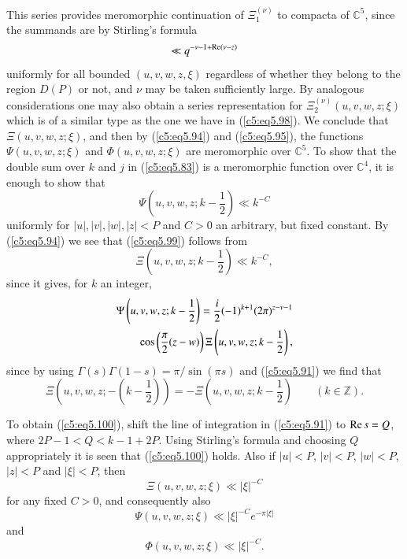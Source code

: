 This series provides meromorphic continuation of $\Xi^{(\nu)}_1$ to
compacta of $\mathbb{C}^5$, since the summands are by Stirling's
formula 
$$
\ll q^{-\nu - 1+ \operatorname{Re} (\nu-z)}
$$
uniformly for all bounded $(u,v,w,z,\xi)$ regardless of whether they
belong to the region $D(P)$ or not, and $\nu$ may be taken
sufficiently large. By analogous considerations one may also obtain a
series representation for $\Xi^{(\nu)}_2(u,v,w,z;\xi)$ which is of a
similar type as the one we have in (\ref{c5:eq5.98}). We conclude that
$\Xi (u,v,w,z;\xi)$, and then by (\ref{c5:eq5.94}) and
(\ref{c5:eq5.95}), the functions $\Psi (u,v,w,z;\xi)$ and $\Phi
(u,v,w,z;\xi)$ are meromorphic over $\mathbb{C}^5$. To show that the
double sum over $k$ and $j$ in (\ref{c5:eq5.83}) is a meromorphic
function over $\mathbb{C}^4$, it is enough to show that  
\begin{equation}
\Psi \left(u,v,w,z; k -\frac{1}{2} \right) \ll k^{-C}\label{c5:eq5.99} 
\end{equation}
uniformly for $|u|, |v|, |w|, |z| < P$ and $C>0$ an arbitrary, but
fixed constant. By (\ref{c5:eq5.94}) we see that (\ref{c5:eq5.99})
follows from  
\begin{equation}
\Xi \left(u,v,w,z;k-\frac{1}{2} \right) \ll k^{-C},
\label{c5:eq5.100} 
\end{equation}
since it gives, for $k$ an integer,
\begin{align} 
& \Psi \left(u,v,w,z;k-\frac{1}{2} \right) = \frac{i}{2} (-1)^{k+1}
  (2\pi)^{z-v-1}\notag \\ 
& \qquad \cos \left(\frac{\pi}{2} (z-w) \right) \Xi
  \left(u,v,w,z;k-\frac{1}{2} \right),\label{c5:eq5.101} 
\end{align}\pageoriginale
since by using $\Gamma (s) \Gamma (1-s) = \pi/ \sin (\pi s)$ and
(\ref{c5:eq5.91}) we find that  
$$
\Xi \left(u,v,w,z; - \left(k-\frac{1}{2} \right) \right) =- \Xi \left(u,v,w,z;k-\frac{1}{2} \right) \qquad (k\in \mathbb{Z}). 
$$ 

To obtain (\ref{c5:eq5.100}), shift the line of integration in
(\ref{c5:eq5.91}) to $\operatorname{Re} s = Q$, where $2P -1 < Q < k-1+2P$. Using
Stirling's formula and choosing $Q$ appropriately it is seen that
(\ref{c5:eq5.100}) holds. Also if $|u|< P$, $|v|  < P$, $|w| < P$,
$|z| < P$ and $|\xi| < P$, then  
\begin{equation}
\Xi (u, v, w, z ; \xi) \ll |\xi|^{-C}\label{c5:eq5.102}
\end{equation}
for any fixed $C>0$, and consequently also
\begin{equation}
\Psi (u,v,w,z;\xi) \ll |\xi|^{-C} e^{-\pi |\xi|}\label{c5:eq5.103}
\end{equation}
and
\begin{equation}
\Phi(u,v,w,z;\xi) \ll |\xi|^{-C}.\label{c5:eq5.104}
\end{equation}

